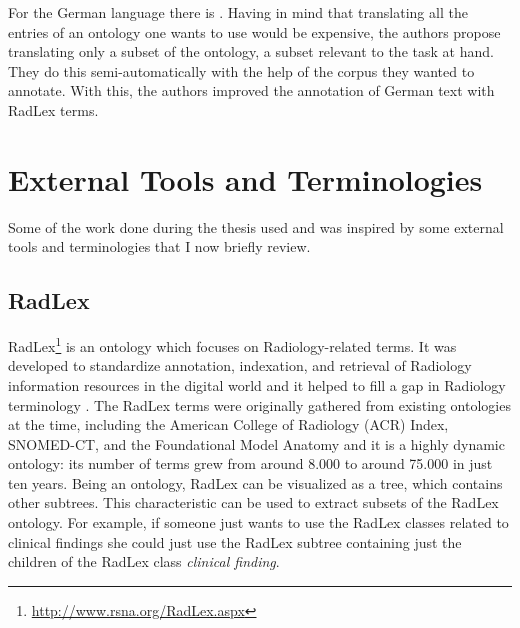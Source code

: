 For the German language there is \citep{Bretschneider}. Having in mind that translating all the entries of an ontology one wants to use would be expensive, the authors propose translating only a subset of the ontology, a subset relevant to the task at hand. They do this semi-automatically with the help of the corpus they wanted to annotate. With this, the authors improved the annotation of German text with RadLex terms.

\section{External Tools and Terminologies}

Some of the work done during the thesis used and was inspired by some external tools and terminologies that I now briefly review.

\subsection{RadLex}
\label{Radlex}

RadLex\footnote{\url{http://www.rsna.org/RadLex.aspx}} is an ontology which focuses on Radiology-related terms. It was developed to standardize annotation, indexation, and retrieval of Radiology information resources in the digital world \citep{Langlotz2006} and it helped to fill a gap in Radiology terminology \citep{Langlotz2002, Woods2013}. The RadLex terms were originally gathered from existing ontologies at the time, including the American College of Radiology (ACR) Index, SNOMED-CT, and the Foundational Model Anatomy and it is a highly dynamic ontology: its number of terms grew from around 8.000 to around 75.000 in just ten years. Being an ontology, RadLex can be visualized as a tree, which contains other subtrees. This characteristic can be used to extract subsets of the RadLex ontology. For example, if someone just wants to use the RadLex classes related to clinical findings she could just use the RadLex subtree containing just the children of the RadLex class \textit{clinical finding}.

